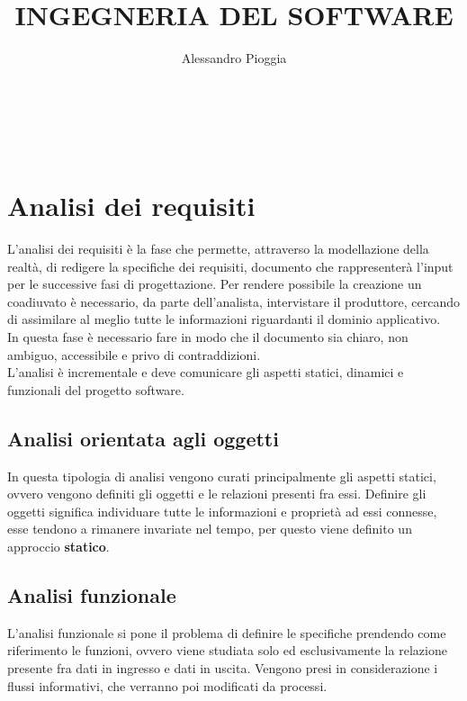 \documentclass[a4paper,12pt]{report}
\title{\textbf{INGEGNERIA DEL SOFTWARE}}
\author{Alessandro Pioggia}
\begin{document}
	
	\makeatletter
	\begin{titlepage}
		\begin{center}
			{\Huge  \@title }\\[3ex] 
			{\large  \@author}\\[3ex] 
			{\large \@date}
		\end{center}
	\end{titlepage}
	\makeatother
	\thispagestyle{empty}
	\newpage
	
	
	\tableofcontents
	
	
	
	\newpage
	
	\chapter{Analisi dei requisiti}
	L'analisi dei requisiti è la fase che permette, attraverso la modellazione della realtà, di redigere la specifiche dei requisiti, documento che rappresenterà l'input per le successive fasi di progettazione. Per rendere possibile la creazione un coadiuvato è necessario, da parte dell'analista, intervistare il produttore, cercando di assimilare al meglio tutte le informazioni riguardanti il dominio applicativo. \\
	In questa fase è necessario fare in modo che il documento sia chiaro, non ambiguo, accessibile e privo di contraddizioni.\\
	L'analisi è incrementale e deve comunicare gli aspetti statici, dinamici e funzionali del progetto software.
	\section{Analisi orientata agli oggetti}
	In questa tipologia di analisi vengono curati principalmente gli aspetti statici, ovvero vengono definiti gli oggetti e le relazioni presenti fra essi. Definire gli oggetti significa individuare tutte le informazioni e proprietà ad essi connesse, esse tendono a rimanere invariate nel tempo, per questo viene definito un approccio \textbf{statico}.
	\section{Analisi funzionale}
	L'analisi funzionale si pone il problema di definire le specifiche prendendo come riferimento le funzioni, ovvero viene studiata solo ed esclusivamente la relazione presente fra dati in ingresso e dati in uscita. Vengono presi in considerazione i flussi informativi, che verranno poi modificati da processi.
\end{document}
